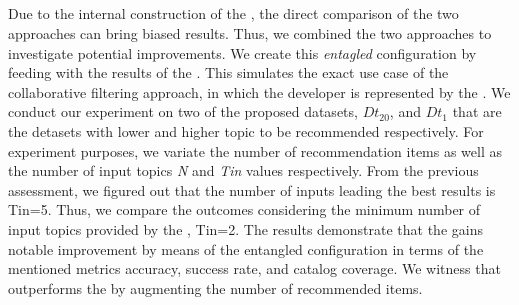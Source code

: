 %

\subsection{\rqsecond} \label{sec:EXP3}



Due to the internal construction of the \MNB, the direct comparison of the two approaches can bring biased results. Thus, we combined the two approaches to investigate potential improvements. We create this \emph{entagled} configuration by feeding \CT with the results of the \MNB. This simulates the exact use case of the collaborative filtering approach, in which the developer is represented by the \MNB. 
We conduct our experiment on two of the proposed datasets, \ie  $Dt_{20}$, and  $Dt_{1}$ that are the detasets with lower and higher topic to be recommended respectively.
For experiment purposes, we variate the number of recommendation items as well as the number of input topics \ie \emph{N} and \emph{Tin} values respectively. From the previous assessment, we figured out that the number of inputs leading the best results is Tin=5. Thus, we compare the outcomes considering the minimum number of input topics provided by the \MNB, \ie Tin=2. The results demonstrate that the \MNB gains notable improvement by means of the entangled configuration in terms of the mentioned metrics \ie accuracy, success rate, and catalog coverage. We witness that \CT outperforms the \MNB by augmenting the number of recommended items. 







